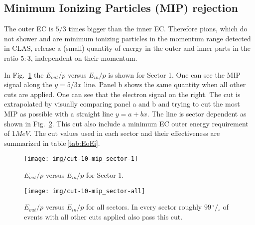 \clearpage\newpage

\subsection{Minimum Ionizing Particles (MIP) rejection}\label{subsec:minimum-ionizing-particles-(mip)-rejection}
The outer EC is $5/3$ times bigger than the inner EC. Therefore pions,
which do not shower and are minimum ionizing particles in the momentum range
detected in CLAS, release a (small) quantity of energy in the outer and inner
parts in the ratio $5:3$, independent on their momentum.

In Fig.~\ref{fig:EoEi} the $E_{out}/p$ versus $E_{in}/p$ is shown for Sector 1.
One can see the MIP signal along the $y=5/3x $ line.
Panel b shows the same quantity when all other cuts are applied.
One can see that the electron signal on the right.
The cut is extrapolated by visually comparing panel a and b and trying to
cut the most MIP as possible with a straight line $y = a + bx$.
The line is sector dependent as shown in Fig.~\ref{fig:EoEi_all}.
This cut also include a minimum EC outer energy requirement of $1MeV$.
The cut values used in each sector and their effectiveness are summarized in
table\,\ref{tab:EoEi}.


\begin{figure}[ht]
    \centering
    \texttt{[image: img/cut-10-mip\_sector-1]}
    \caption{$E_{out}/p$ versus $E_{in}/p$ for Sector 1.}
    \label{fig:EoEi}
\end{figure}


\clearpage\newpage
\begin{figure}[ht]
    \centering
    \texttt{[image: img/cut-10-mip\_sector-all]}
    \caption{$E_{out}/p$ versus $E_{in}/p$ for all sectors. In every sector
    roughly $99\,^{\circ\!\!}/\!_\circ$ of events with all other cuts applied also pass this cut. }
    \label{fig:EoEi_all}
\end{figure}

\clearpage\newpage

